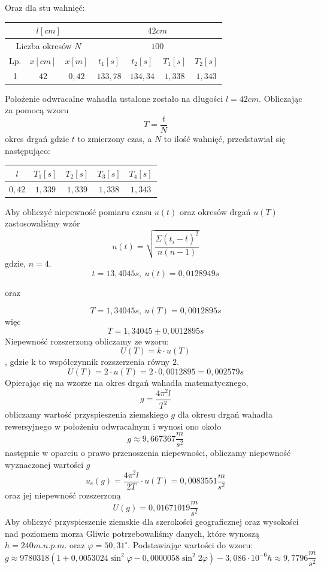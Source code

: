 \documentclass{article}
\begin{document}
Oraz dla stu wahnięć:
\begin{center}
    \begin{tabular}{|c|c|c|c|c|c|c|}
    \hline
    \multicolumn{3}{|c|}{$l[cm]$} & \multicolumn{4}{|c|}{$42cm$} \\ \hline
    \multicolumn{3}{|c|}{Liczba okresów $N$} & \multicolumn{4}{|c|}{$100$} \\ \hline
    Lp. & $x[cm]$ & $x[m]$ & $t_1[s]$ & $t_2[s]$ & $T_1[s]$ & $T_2[s]$\\ \hline
    1 & $42$ & $0,42$ & $133,78$ & $134,34$ & $1,338$ & $1,343$ \\ \hline
    \end{tabular}
\end{center}
Położenie odwracalne wahadła ustalone zostało na długości $l = 42cm$. Obliczając za pomocą wzoru 
$$T = \frac{t}{N}$$
okres drgań gdzie $t$ to zmierzony czas, a $N$ to ilość wahnięć, przedstawiał się następująco:
\begin{center}
    \begin{tabular}{|c|c|c|c|c|}
    \hline
    $l$ & $T_1[s]$ & $T_2[s]$ & $T_3[s]$ & $T_4[s]$ \\ \hline
    $0,42$ & $1,339$ & $1,339$ & $1,338$ & $1,343$ \\ \hline
    
    \end{tabular}
\end{center}
Aby obliczyć niepewność pomiaru czasu $u(t)$  oraz okresów drgań $u(T)$ zastosowaliśmy wzór
$$u(t) = \sqrt{\frac{\Sigma(t_i-\overline{t})^2}{n(n-1)}}$$
gdzie, $n=4$.
$$t = 13,4045s,\ u(t) = 0,0128949s$$
\begin{center}
oraz
\end{center}
$$T = 1,34045s,\ u(T) = 0,0012895s$$
więc 
$$T = 1,34045\pm 0,0012895 s$$
Niepewność rozszerzoną obliczamy ze wzoru:
$$U(T)=k\cdot u(T)$$
, gdzie k to współczynnik rozszerzenia równy $2$.
$$U(T)=2\cdot u(T)=2\cdot 0,0012895=0,002579s$$
Opierając się na wzorze na okres drgań wahadła matematycznego,
$$g = \frac{4\pi^2l}{T^2}$$
obliczamy wartość przyspieszenia ziemskiego $g$ dla okresu drgań wahadła rewersyjnego w położeniu odwracalnym i wynosi ono około
$$g\approx9,667367\frac{m}{s^2}$$
następnie w oparciu o prawo przenoszenia niepewności, obliczamy niepewność wyznaczonej wartości $g$
$$u_c(g) = \frac{4\pi^2l}{2T}\cdot u(T) = 0,0083551 \frac{m}{s^2}$$
oraz jej niepewność rozszerzoną
$$U(g) = 0,01671019\frac{m}{s^2}$$
Aby obliczyć przyspieszenie ziemskie dla szerokości geograficznej oraz wysokości nad poziomem morza Gliwic potrzebowaliśmy danych, które wynoszą $h=240 m.n.p.m.$ oraz $\varphi = 50,31^{\circ}$. Podstawiając wartości do wzoru:
$$g\approx 9780318(1+0,0053024\sin^2 \varphi-0,0000058\sin^2 2\varphi ) - 3,086\cdot 10^{-6}h \approx 9,7796 \frac{m}{s^2}$$
\end{document}
